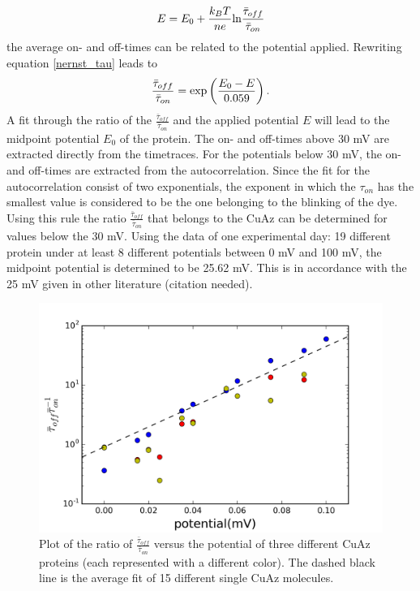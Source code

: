 \documentclass[twoside,single]{lion-msc}
\begin{document}
\begin{equation}\label{nernst_tau}
E = E_{0}+\frac{k_{B}T}{ne}\textup{ln}\frac{\bar{\tau}_{off}}{\bar{\tau}_{on}}
\end{equation}
the average on- and off-times can be related to the potential applied. Rewriting equation \ref{nernst_tau} leads to
\begin{equation}\label{fit_onoff}
\frac{\bar{\tau}_{off}}{\bar{\tau}_{on}} = \textup{exp}\left ( \frac{E_{0}-E}{0.059} \right ).
\end{equation}
A fit through the ratio of the $\frac{\bar{\tau}_{off}}{\bar{\tau}_{on}}$ and the applied potential $E$ will lead to the midpoint potential $E_{0}$ of the protein. The on- and off-times above 30 mV are extracted directly from the timetraces. For the potentials below 30 mV, the on- and off-times are extracted from the autocorrelation. Since the fit for the autocorrelation consist of two exponentials, the exponent in which the $\tau_{on}$ has the smallest value is considered to be the one belonging to the blinking of the dye. Using this rule the ratio $\frac{\bar{\tau}_{off}}{\bar{\tau}_{on}}$ that belongs to the CuAz can be determined for values below the 30 mV. Using the data of one experimental day: 19 different protein under at least 8 different potentials between 0 mV and 100 mV, the midpoint potential is determined to be 25.62 mV. This is in accordance with the 25 mV given in other literature (citation needed). 

\begin{figure}[ht!]
\centering
\includegraphics[width=.9\textwidth]{t_ratio_plot}
\caption{Plot of the ratio of $\frac{\bar{\tau}_{off}}{\bar{\tau}_{on}}$ versus the potential of three different CuAz proteins (each represented with a different color). The dashed black line is the average fit of 15 different single CuAz molecules.}
\label{t_ratio_plot}
\end{figure}



\end{document}
